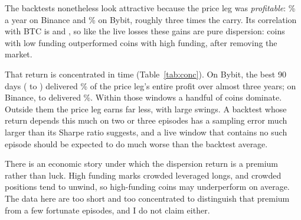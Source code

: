 \documentclass[11pt,a4paper]{article}
\begin{document}
The backtests nonetheless look attractive because the price leg was \emph{profitable}:
\BnBasePrice\% a year on Binance and \ByBasePrice\% on Bybit, roughly three times the
carry. Its correlation with BTC is \BnBaseCorr{} and \ByBaseCorr{}, so like the live
losses these gains are pure dispersion: coins with low funding outperformed coins with
high funding, after removing the market.

\begin{table}[h]
  \centering
  \small
  \caption{Concentration of the price leg's backtest return. Contributions are
  cumulative $\sum_t w_{i,t-1} r_{i,t}$ over the window, in percent of equity.}
  \label{tab:conc}
\end{table}

That return is concentrated in time (Table~\ref{tab:conc}). On Bybit, the best 90 days
(\ByBestWinStart{} to \ByBestWinEnd) delivered \ByBestWinShare\% of the price leg's
entire profit over almost three years; on Binance, \BnBestWinStart{} to
\BnBestWinEnd{} delivered \BnBestWinShare\%. Within those windows a handful of coins
dominate. Outside them the price leg earns far less, with large swings. A backtest
whose return depends this much on two or three episodes has a sampling error much
larger than its Sharpe ratio suggests, and a live window that contains no such episode
should be expected to do much worse than the backtest average.

There is an economic story under which the dispersion return is a premium rather than
luck. High funding marks crowded leveraged longs, and crowded positions tend to unwind,
so high-funding coins may underperform on average. The data here are too short and too
concentrated to distinguish that premium from a few fortunate episodes, and I do not
claim either.
\end{document}
